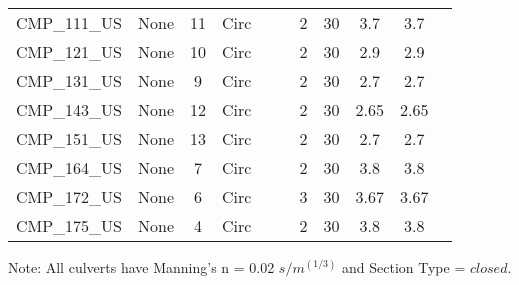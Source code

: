 \begin{table}[]
\begin{tabular}{@{}lcccccccccc@{}}
CMP\_111\_US  & None       & 11       & Circ &        &       & 2        & 30     & 3.7       & 3.7        \\
CMP\_121\_US  & None       & 10       & Circ &        &       & 2        & 30     & 2.9       & 2.9        \\
CMP\_131\_US  & None       & 9        & Circ &        &       & 2        & 30     & 2.7       & 2.7        \\
CMP\_143\_US  & None       & 12       & Circ &        &       & 2        & 30     & 2.65      & 2.65       \\
CMP\_151\_US  & None       & 13       & Circ &        &       & 2        & 30     & 2.7       & 2.7        \\
CMP\_164\_US  & None       & 7        & Circ &        &       & 2        & 30     & 3.8       & 3.8        \\
CMP\_172\_US  & None       & 6        & Circ &        &       & 3        & 30     & 3.67      & 3.67       \\
CMP\_175\_US  & None       & 4        & Circ &        &       & 2        & 30     & 3.8       & 3.8        \\
\bottomrule
\end{tabular}

Note: All culverts have Manning's n = 0.02 $s/m^{(1/3)}$ and Section Type = $closed$.
\end{table}

